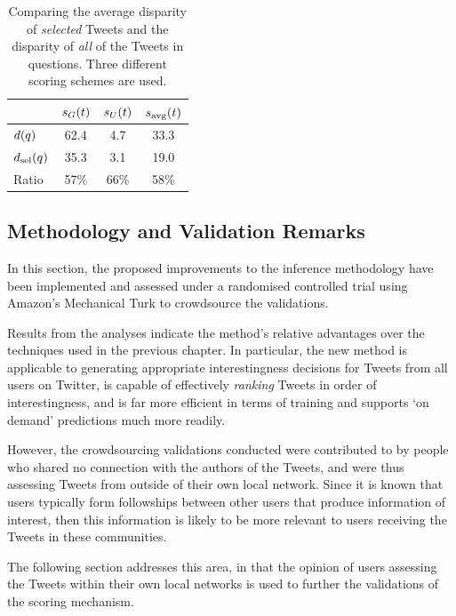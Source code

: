 \begin{table}[h]\footnotesize
\begin{center}
\begin{tabular}{ l || c | c | c }
	   & $s_G(t)$ &  $s_U(t)$ &  $s_{\textrm{avg}}(t)$\\
	 \hline
     \hline
	$d(q)$ & 62.4 & 4.7 & 33.3\\
	$d_{\textrm{sel}}(q)$ & 35.3 & 3.1 & 19.0\\
	 \hline
	Ratio & 57\% & 66\% & 58\%\\
     \hline
\end{tabular}
\end{center}
\caption{Comparing the average disparity of \textit{selected} Tweets and the disparity of \textit{all} of the Tweets in questions. Three different scoring schemes are used.}
\label{table:score-disparities-2}
\end{table}


\subsection{Methodology and Validation Remarks}
In this section, the proposed improvements to the inference methodology have been implemented and assessed under a randomised controlled trial using Amazon's Mechanical Turk to crowdsource the validations.

Results from the analyses indicate the method's relative advantages over the techniques used in the previous chapter. In particular, the new method is applicable to generating appropriate interestingness decisions for Tweets from all users on Twitter, is capable of effectively \textit{ranking} Tweets in order of interestingness, and is far more efficient in terms of training and supports `on demand' predictions much more readily.

However, the crowdsourcing validations conducted were contributed to by people who shared no connection with the authors of the Tweets, and were thus assessing Tweets from outside of their own local network. Since it is known that users typically form followships between other users that produce information of interest, then this information is likely to be more relevant to users receiving the Tweets in these communities.  

The following section addresses this area, in that the opinion of users assessing the Tweets within their own local networks is used to further the validations of the scoring mechanism. 


